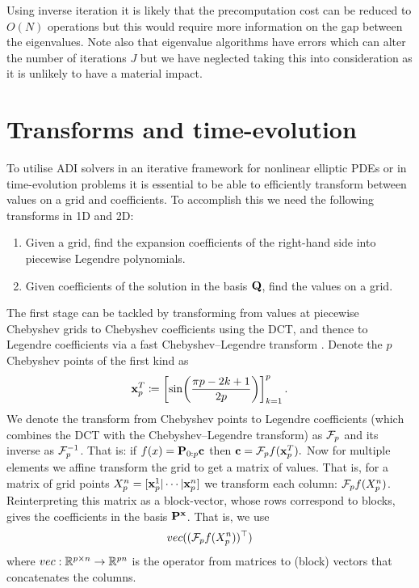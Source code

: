 \documentclass[hidelinks,onefignum,onetabnum]{siamart220329}
\def\bfP{{\bf P}}
\def\bfx{{\bf x}}
\def\bfc{{\bf c}}
\def\bfQ{{\bf Q}}
\def\pr(#1){\left({#1}\right)}
\def\br[#1]{\left[{#1}\right]}
\def\bbR{{\mathbb R}}
\begin{document}
\begin{remark}
Using inverse iteration it is likely that the precomputation cost can be reduced to
$O(N)$ operations but this would require more information on the gap between the eigenvalues. Note also that eigenvalue algorithms have errors which can alter the number of iterations $J$ but we have neglected taking this into consideration as it is unlikely to have a material impact. 
\end{remark}






\section{Transforms and time-evolution}\label{Section:Transforms}

To utilise ADI solvers in an iterative framework for nonlinear elliptic PDEs or in time-evolution problems it is essential to be able to efficiently transform between  values on a grid and coefficients. To accomplish this we need the following transforms in 1D and 2D:

\begin{enumerate}
\item Given a grid, find  the expansion coefficients of the right-hand side into piecewise Legendre polynomials.
\item Given coefficients of the solution in the basis  $\bfQ$, find the values on a grid. 
\end{enumerate} 

The first stage  can be tackled by transforming from values at piecewise Chebyshev grids to
Chebyshev coefficients using the DCT, and thence to Legendre coefficients via a fast Chebyshev--Legendre
transform \cite{alpert1991fast,keiner2011fast,townsend2018fast}. Denote the $p$ Chebyshev points of the first kind as
\[
	\bfx_p^{\rm T} \coloneqq \br[\sin\!\pr(\pi {p-2k+1 \over 2p})]_{k=1}^p.
\]
We denote the transform from Chebyshev points to Legendre coefficients (which combines the DCT with the Chebyshev--Legendre transform) as ${\cal F}_p$ and its inverse as ${\cal F}_p^{-1}$. That is: if
$
f(x) = \bfP_{0:p} \bfc
$
then 
$\bfc = {\cal F}_p f(\bfx_p^{\rm T}).$ Now for multiple elements we affine transform the grid to get a matrix of values. That is, for a matrix of grid points $X_p^n = [\bfx_p^1 | \cdots | \bfx_p^n]$ we transform each column:
$
{\cal F}_p f(X_p^n)
$. Reinterpreting this matrix as a block-vector, whose rows correspond to blocks, gives the coefficients in the basis $\bfP^\bfx$. That is, we use
\[
	{\rm vec}(({\cal F}_p f(X_p^n))^\top)
\]
where
$
{\rm vec} : \bbR^{p \times n} \rightarrow \bbR^{p n}
$
is the operator from matrices to (block) vectors that concatenates the columns.
\end{document}
